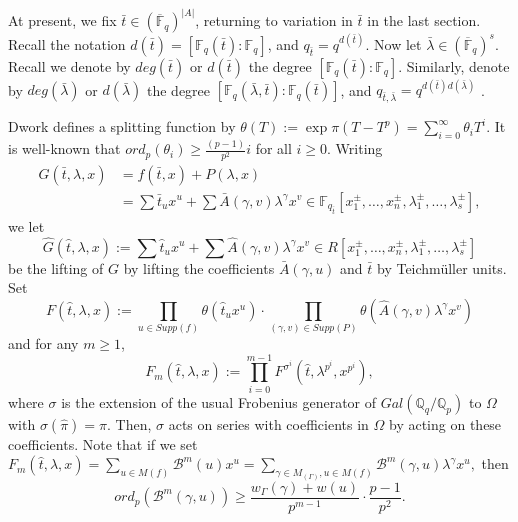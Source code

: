 \documentclass{article}
\theoremstyle{remark}
\def\bb #1{ {\mathbb #1} }
\begin{document}
\bigskip{} At present, we fix $\bar t \in (\overline{\bb F}_q)^{|A|}$, returning to variation in $\bar t$ in the last section.  Recall the notation $d({\bar t})= [\bb {F}_q({\bar t}):\bb{F}_q]$, and $q_{\bar t} = q^{d({\bar t})} $. Now let $\bar \lambda \in (\overline{\bb F}_q)^s$.  Recall we denote by $deg(\bar t)$ or $d(\bar t)$ the degree $[\bb F_q(\bar t) : \bb F_q]$. Similarly, denote by $deg(\bar \lambda)$ or $d(\bar {\lambda})$ the degree $[\bb F_q(\bar \lambda,\bar t): \bb F_q(\bar t)]$, and $q_{\bar t, \bar {\lambda}} = q^{d(\bar t)d(\bar {\lambda})}$ .

Dwork defines a splitting function by $\theta(T) := \exp \pi (T - T^p) = \sum_{i = 0}^\infty \theta_i T^i$. It is well-known that $ord_p(\theta_i) \geq \frac{(p-1)}{p^2} i$ for all $i \geq 0$. Writing
\begin{align*}
G(\bar t, \lambda, x) &= f(\bar t, x) + P(\lambda, x) \\
&= \sum \bar t_u x^u + \sum \bar A(\gamma, v) \lambda^\gamma x^v \in \bb F_{q_{\bar t}}[x_1^\pm, \ldots, x_n^\pm, \lambda_1^\pm, \ldots, \lambda_s^\pm],
\end{align*}
we let 
\[
\hat G(\hat t, \lambda, x) := \sum \hat t_u x^u + \sum \hat {A}(\gamma, v) \lambda^\gamma x^v \in R[x_1^\pm, \ldots, x_n^\pm, \lambda_1^\pm, \ldots, \lambda_s^\pm]
\]
be the lifting of $G$ by lifting the coefficients $\bar A(\gamma, u)$ and $\bar t$ by Teichm\"uller units. Set 
\begin{equation}\label{E: 38a}
 F(\hat t, \lambda, x) := \prod_{u \in Supp(f)} \theta(\hat t_u x^u) \cdot \prod_{(\gamma, v) \in Supp(P)} \theta( \hat {A}(\gamma, v) \lambda^\gamma x^v)
\end{equation}
and for any $m \geq 1$,
\begin{equation}\label{E: 38b}
 F_m(\hat t, \lambda, x) := \prod_{i=0}^{m-1}  F^{\sigma^i}(\hat t, \lambda^{p^i}, x^{p^i}),
\end{equation}
where $\sigma$ is the extension of the usual Frobenius generator of $Gal(\bb Q_q / \bb Q_p)$ to $\Omega$ with $\sigma(\hat\pi)=\hat \pi.$ Then, $ \sigma$ acts on series with coefficients in $\Omega$ by acting on these coefficients. Note that if we set $F_m(\hat t, \lambda, x) = \sum_{u \in M(f)} \mathcal{B}^m(u)x^u = \sum_{\gamma \in M_(\Gamma), u \in M(f)} \mathcal{B}^m (\gamma, u) \lambda^{\gamma} x^u ,$ then 
\[
ord_p (\mathcal{B}^m (\gamma, u)) \geq \frac{w_{\Gamma}(\gamma) + w(u)}{p^{m-1}} \cdot \frac{p-1}{p^2}.
\]
\end{document}
